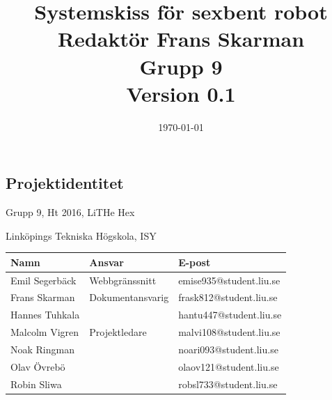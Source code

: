 \documentclass[a4paper,titlepage,12pt]{article}
\begin{document}
    \title{\LARGE
        \textbf{Systemskiss för sexbent robot} \\
        \vspace*{0.5\baselineskip}
        \large
        Redaktör Frans Skarman \\
        Grupp 9 \\
        \small
        \vspace*{0.5\baselineskip}
        Version 0.1}

    \date{\today}

	\maketitle
	
	\newpage
	
	\begin{center}


		\section*{Projektidentitet}
		Grupp 9, Ht 2016, LiTHe Hex

		Linköpings Tekniska Högskola, ISY

		\begin{table}[h]
			\begin{center}
				\begin{tabular}[pos]{ l l l }
					\textbf{Namn} & \textbf{Ansvar} & \textbf{E-post} \\ \midrule
					Emil Segerbäck & Webbgränssnitt & emise935@student.liu.se \\ \midrule
					Frans Skarman & Dokumentansvarig & frask812@student.liu.se \\ \midrule
					Hannes Tuhkala & & hantu447@student.liu.se \\ \midrule
					Malcolm Vigren & Projektledare & malvi108@student.liu.se \\ \midrule
					Noak Ringman &  & noari093@student.liu.se \\ \midrule
					Olav Övrebö &  & olaov121@student.liu.se \\ \midrule
					Robin Sliwa &  & robsl733@student.liu.se \\
				\end{tabular}
			\end{center}
		\end{table}


\end{center}
\end{document}
